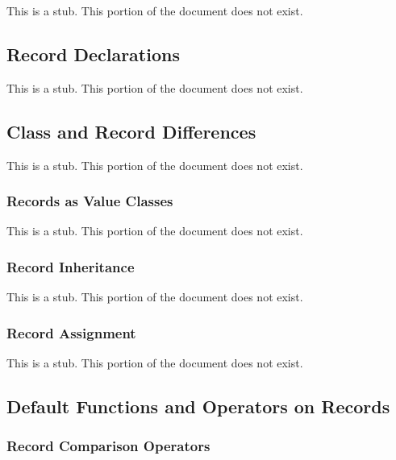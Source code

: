 \label{Records}

This is a stub.  This portion of the document does not exist.

\subsection{Record Declarations}
\label{Record_Declarations}

This is a stub.  This portion of the document does not exist.

\subsection{Class and Record Differences}
\label{Class_and_Record_Differences}

This is a stub.  This portion of the document does not exist.

\subsubsection{Records as Value Classes}
\label{Records_as_Value_Classes}

This is a stub.  This portion of the document does not exist.

\subsubsection{Record Inheritance}
\label{Record_Inheritance}

This is a stub.  This portion of the document does not exist.

\subsubsection{Record Assignment}
\label{Record_Assignment}

This is a stub.  This portion of the document does not exist.

\subsection{Default Functions and Operators on Records}

\subsubsection{Record Comparison Operators}
\label{Record_Comparison_Operators}

